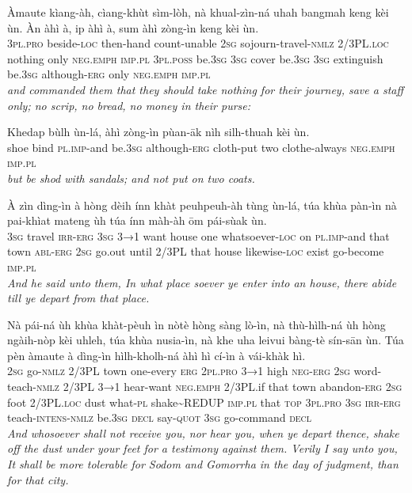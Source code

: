 \documentclass[11pt,a4paper]{article}
\begin{document}
\begin{exe}
\gll Àmaute kìang-àh, cìang-khùt sìm-lòh, nà khual-zìn-ná uhah bangmah keng kèi ùn. Àn àhì à, ip àhì à, sum àhì zòng-ìn keng kèi ùn. \\
     \textsc{3pl}.\textsc{pro} beside-\textsc{loc} then-hand count-unable \textsc{2sg} sojourn-travel-\textsc{nmlz} 2/3PL.\textsc{loc} nothing only \textsc{neg}.\textsc{emph} \textsc{imp}.\textsc{pl} \textsc{3pl}.\textsc{poss} be.\textsc{3sg} \textsc{3sg} cover be.\textsc{3sg} \textsc{3sg} extinguish be.\textsc{3sg} although-\textsc{erg} only \textsc{neg}.\textsc{emph} \textsc{imp}.\textsc{pl} \\
\glt \textcolor{kjvcolor}{\textit{and commanded them that they should take nothing for their journey, save a staff only; no scrip, no bread, no money in their purse:}}

\gll Khedap bùlh ùn-lá, àhì zòng-ìn pùan-āk nìh silh-thuah kèi ùn. \\
     shoe bind \textsc{pl}.\textsc{imp}-and be.\textsc{3sg} although-\textsc{erg} cloth-put two clothe-always \textsc{neg}.\textsc{emph} \textsc{imp}.\textsc{pl} \\
\glt \textcolor{kjvcolor}{\textit{but be shod with sandals; and not put on two coats.}}

\gll À zìn dìng-ìn à hòng dèih ínn khàt peuhpeuh-àh tùng ùn-lá, túa khùa pàn-ìn nà pai-khìat mateng ùh túa ínn màh-àh ōm pái-sùak ùn. \\
     \textsc{3sg} travel \textsc{irr}-\textsc{erg} \textsc{3sg} \textsc{3→1} want house one whatsoever-\textsc{loc} on \textsc{pl}.\textsc{imp}-and that town \textsc{abl}-\textsc{erg} \textsc{2sg} go.out until 2/3PL that house likewise-\textsc{loc} exist go-become \textsc{imp}.\textsc{pl} \\
\glt \textcolor{kjvcolor}{\textit{And he said unto them, In what place soever ye enter into an house, there abide till ye depart from that place.}}

\gll Nà pái-ná ùh khùa khàt-pèuh ìn nòtè hòng sàng lò-ìn, nà thù-hìlh-ná ùh hòng ngàih-nòp kèi uhleh, túa khùa nusia-ìn, nà khe uha leivui bàng-tè sín-sān ùn. Túa pèn àmaute à dìng-ìn hìlh-kholh-ná àhì hì cí-ìn à vái-khàk hì. \\
     \textsc{2sg} go-\textsc{nmlz} 2/3PL town one-every \textsc{erg} \textsc{2pl}.\textsc{pro} \textsc{3→1} high \textsc{neg}-\textsc{erg} \textsc{2sg} word-teach-\textsc{nmlz} 2/3PL \textsc{3→1} hear-want \textsc{neg}.\textsc{emph} 2/3PL.if that town abandon-\textsc{erg} \textsc{2sg} foot 2/3PL.\textsc{loc} dust what-\textsc{pl} shake\textasciitilde{}REDUP \textsc{imp}.\textsc{pl} that \textsc{top} \textsc{3pl}.\textsc{pro} \textsc{3sg} \textsc{irr}-\textsc{erg} teach-\textsc{intens}-\textsc{nmlz} be.\textsc{3sg} \textsc{decl} say-\textsc{quot} \textsc{3sg} go-command \textsc{decl} \\
\glt \textcolor{kjvcolor}{\textit{And whosoever shall not receive you, nor hear you, when ye depart thence, shake off the dust under your feet for a testimony against them. Verily I say unto you, It shall be more tolerable for Sodom and Gomorrha in the day of judgment, than for that city.}}


\end{exe}
\end{document}
